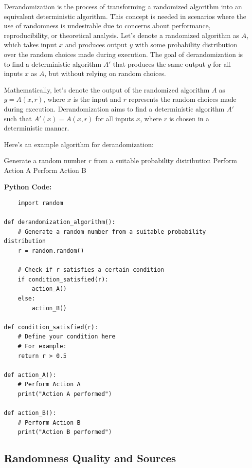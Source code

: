 \documentclass[12pt]{book} %
\begin{document}
Derandomization is the process of transforming a randomized algorithm into an equivalent deterministic algorithm. This concept is needed in scenarios where the use of randomness is undesirable due to concerns about performance, reproducibility, or theoretical analysis. Let's denote a randomized algorithm as $A$, which takes input $x$ and produces output $y$ with some probability distribution over the random choices made during execution. The goal of derandomization is to find a deterministic algorithm $A'$ that produces the same output $y$ for all inputs $x$ as $A$, but without relying on random choices.

Mathematically, let's denote the output of the randomized algorithm $A$ as $y = A(x, r)$, where $x$ is the input and $r$ represents the random choices made during execution. Derandomization aims to find a deterministic algorithm $A'$ such that $A'(x) = A(x, r)$ for all inputs $x$, where $r$ is chosen in a deterministic manner.

Here's an example algorithm for derandomization:
\FloatBarrier
\begin{algorithm}[H]
\caption{Derandomization Algorithm}
\begin{algorithmic}[1]
\State Generate a random number $r$ from a suitable probability distribution
    \State Perform Action A
\Else
    \State Perform Action B
\EndIf
\end{algorithmic}
\end{algorithm}
\FloatBarrier
\textbf{Python Code:}
\FloatBarrier
\begin{lstlisting}
    import random

def derandomization_algorithm():
    # Generate a random number from a suitable probability distribution
    r = random.random()
    
    # Check if r satisfies a certain condition
    if condition_satisfied(r):
        action_A()
    else:
        action_B()

def condition_satisfied(r):
    # Define your condition here
    # For example:
    return r > 0.5

def action_A():
    # Perform Action A
    print("Action A performed")

def action_B():
    # Perform Action B
    print("Action B performed")
\end{lstlisting}

\subsection{Randomness Quality and Sources}
\end{document}

